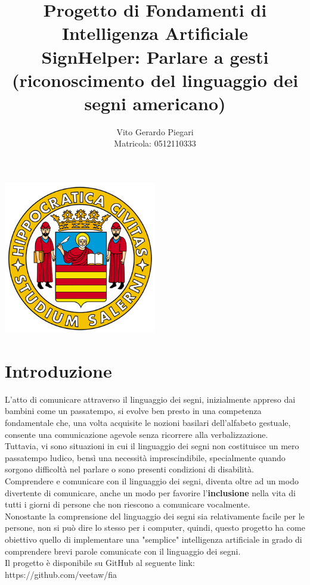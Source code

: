 \documentclass{article}
\title{Progetto di Fondamenti di Intelligenza Artificiale\\SignHelper: Parlare a gesti (riconoscimento del linguaggio dei segni americano)}
\author{Vito Gerardo Piegari\\Matricola: 0512110333}
\date{}
\begin{document}
\maketitle
\begin{center}
  \includegraphics[width=0.5\textwidth]{unisa_logo.png}
\end{center}

\newpage

\renewcommand{\contentsname}{Indice}
\tableofcontents

\newpage

\section{Introduzione}
L'atto di comunicare attraverso il linguaggio dei segni, inizialmente appreso dai bambini come un passatempo, si evolve ben presto in una competenza fondamentale che, una volta acquisite le nozioni basilari dell'alfabeto gestuale, consente una comunicazione agevole senza ricorrere alla verbalizzazione.\\
Tuttavia, vi sono situazioni in cui il linguaggio dei segni non costituisce un mero passatempo ludico, bensì una necessità imprescindibile, specialmente quando sorgono difficoltà nel parlare o sono presenti condizioni di disabilità.\\
Comprendere e comunicare con il linguaggio dei segni, diventa oltre ad un modo divertente di comunicare, anche un modo per favorire l'\textbf{inclusione} nella vita di tutti i giorni di persone che non riescono a comunicare vocalmente.\\
Nonostante la comprensione del linguaggio dei segni sia relativamente facile per le persone, non si può dire lo stesso per i computer, quindi, questo progetto ha come obiettivo quello di implementare una "semplice" intelligenza artificiale in grado di comprendere brevi parole comunicate con il linguaggio dei segni.\\
Il progetto è disponibile su GitHub al seguente link: https://github.com/veetaw/fia
\end{document}
